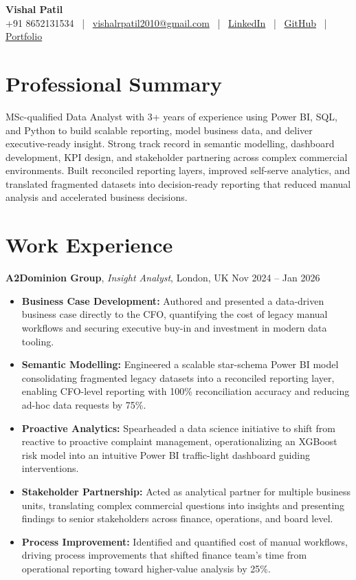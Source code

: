 \documentclass[10pt, a4paper]{article}
\begin{document}
\begin{center}
    {\LARGE \textbf{Vishal Patil}} \\[2pt]
    +91 8652131534 \, | \, \href{mailto:vishalrpatil2010@gmail.com}{vishalrpatil2010@gmail.com} \, | \, \href{https://www.linkedin.com/in/vishalrpatill/}{LinkedIn} \, | \, \href{https://github.com/VishalP44}{GitHub} \, | \, \href{https://vishalp44.github.io/Vishal\_Patil\_Portfolio/\#contact}{Portfolio}
\end{center}

\section*{Professional Summary}
MSc-qualified Data Analyst with 3+ years of experience using Power BI, SQL, and Python to build scalable reporting, model business data, and deliver executive-ready insight. Strong track record in semantic modelling, dashboard development, KPI design, and stakeholder partnering across complex commercial environments. Built reconciled reporting layers, improved self-serve analytics, and translated fragmented datasets into decision-ready reporting that reduced manual analysis and accelerated business decisions.

\section*{Work Experience}

\textbf{A2Dominion Group}, \textit{Insight Analyst}, London, UK \hfill Nov 2024 -- Jan 2026
\begin{itemize}
    \item \textbf{Business Case Development:} Authored and presented a data-driven business case directly to the CFO, quantifying the cost of legacy manual workflows and securing executive buy-in and investment in modern data tooling.
    \item \textbf{Semantic Modelling:} Engineered a scalable star-schema Power BI model consolidating fragmented legacy datasets into a reconciled reporting layer, enabling CFO-level reporting with 100\% reconciliation accuracy and reducing ad-hoc data requests by 75\%.
    \item \textbf{Proactive Analytics:} Spearheaded a data science initiative to shift from reactive to proactive complaint management, operationalizing an XGBoost risk model into an intuitive Power BI traffic-light dashboard guiding interventions.
    \item \textbf{Stakeholder Partnership:} Acted as analytical partner for multiple business units, translating complex commercial questions into insights and presenting findings to senior stakeholders across finance, operations, and board level.
    \item \textbf{Process Improvement:} Identified and quantified cost of manual workflows, driving process improvements that shifted finance team's time from operational reporting toward higher-value analysis by 25\%.
\end{itemize}
\end{document}
